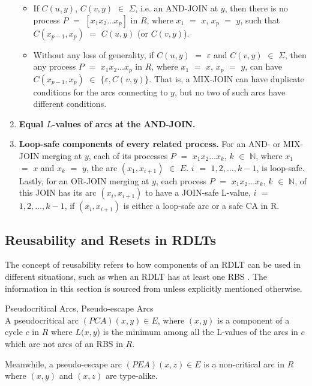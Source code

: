 \begin{defn}
\begin{enumerate}
\begin{itemize}
            \item If $ C(u,y) $, $ C(v,y) $ $ \in $ $ \Sigma $, i.e. an AND-JOIN at $ y $, then there is no process $ P $ $ = $ $ [x_1 x_2 \ldots x_p] $ in $ R $, where $ x_1 $ $ = $ $ x $, $ x_p $ $ = $ $ y $, such that $ C(x_{p-1}, x_p ) $ $ = $ $ C(u,y) $ (or $ C(v,y) $).
            \item Without any loss of generality, if $ C(u,y) $ $ = $ $ \varepsilon $ and $ C(v,y) $ $ \in $ $ \Sigma $, then any process $ P $ $ = $ $ x_1 x_2 \ldots x_p $ in $ R $, where $ x_1 $ $ = $ $ x $, $ x_p $ $ = $ $ y $, can have $ C(x_{p-1}, x_p) $ $ \in $ $ \{\varepsilon, C(v,y)\}$. That is, a MIX-JOIN can have duplicate conditions for the arcs connecting to $y$, but no two of such arcs have different conditions.
        \end{itemize}
        \item \textbf{Equal $ L $-values of arcs at the AND-JOIN.}
        \item \textbf{Loop-safe components of every related process.} For an AND- or MIX-JOIN merging at $y$, each of its processes $ P $ $ = $ $ x_1 x_2 \ldots x_k $, $ k $ $ \in $ $ \mathbb{N} $, where $ x_1 $ $ = $ $ x $ and $ x_k $ $ = $ $ y $, the arc $ (x_1, x_{i+1}) $ $ \in $ $ E $. $ i $ $ = $ $ 1, 2, \ldots, k - 1 $, is loop-safe. Lastly, for an OR-JOIN merging at $ y $, each process $ P $ $ = $ $ x_1 x_2 \ldots x_k $, $ k $ $ \in $ $ \mathbb{N} $, of this JOIN has its arc $ (x_i,x_{i+1}) $ to have a JOIN-safe L-value, $ i $ $ = $ $ 1, 2, \ldots, k - 1 $, if $ (x_i, x_{i+1}) $ is either a loop-safe arc or a safe CA in R.
    \end{enumerate}
    
\end{defn}
\subsection*{Reusability and Resets in RDLTs}
The concept of reusability refers to how components of an RDLT can be used in different situations, such as when an RDLT has at least one RBS \cite{MalinaoWCTP2023}. The information in this section is sourced from \cite{MalinaoWCTP2023} unless explicitly mentioned otherwise.


\begin{defn} Pseudocritical Arcs, Pseudo-escape Arcs \\
A pseudocritical arc $(PCA) (x,y) \in E$, where $(x,y)$ is a component of a cycle $c$ in $R$ where $L(x,y$) is the minimum among all the L-values of the arcs in $c$ which are not arcs of an RBS in $R$.

Meanwhile, a pseudo-escape arc $(PEA) (x,z) \in E$ is a non-critical arc in $R$ where $(x,y)$ and $(x,z)$ are type-alike.    
\end{defn}

